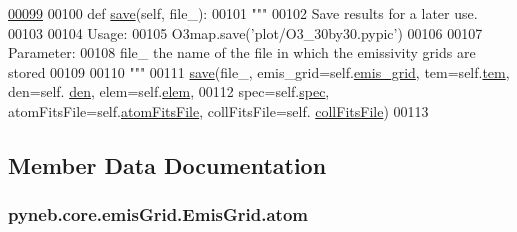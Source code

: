 \begin{DoxyCode}
\hypertarget{classpyneb_1_1core_1_1emis_grid_1_1_emis_grid_l00099}{}\hyperlink{classpyneb_1_1core_1_1emis_grid_1_1_emis_grid_a7ce505278e7503e56c2191db54e7d227}{00099} 
00100     \textcolor{keyword}{def }\hyperlink{classpyneb_1_1core_1_1emis_grid_1_1_emis_grid_a7ce505278e7503e56c2191db54e7d227}{save}(self, file\_):
00101         \textcolor{stringliteral}{"""}
00102 \textcolor{stringliteral}{        Save results for a later use.}
00103 \textcolor{stringliteral}{        }
00104 \textcolor{stringliteral}{        Usage:}
00105 \textcolor{stringliteral}{            O3map.save('plot/O3\_30by30.pypic')}
00106 \textcolor{stringliteral}{        }
00107 \textcolor{stringliteral}{        Parameter:}
00108 \textcolor{stringliteral}{            file\_  the name of the file in which the emissivity grids are stored}
00109 \textcolor{stringliteral}{}
00110 \textcolor{stringliteral}{        """}
00111         \hyperlink{classpyneb_1_1core_1_1emis_grid_1_1_emis_grid_a7ce505278e7503e56c2191db54e7d227}{save}(file\_, emis\_grid=self.\hyperlink{classpyneb_1_1core_1_1emis_grid_1_1_emis_grid_a6fd6b209384aaa2cd4ba5051477e4ecb}{emis\_grid}, tem=self.\hyperlink{classpyneb_1_1core_1_1emis_grid_1_1_emis_grid_ac6e2be63ad3ea6c0d246d1c6d1afc54b}{tem}, den=self.
      \hyperlink{classpyneb_1_1core_1_1emis_grid_1_1_emis_grid_ac393173ea0ffbfdffb4c095fa6acada1}{den}, elem=self.\hyperlink{classpyneb_1_1core_1_1emis_grid_1_1_emis_grid_a860a236b0e426b4671071e4bf492dee7}{elem},
00112              spec=self.\hyperlink{classpyneb_1_1core_1_1emis_grid_1_1_emis_grid_a78618aff86ea296ecefddcc86d98b687}{spec}, atomFitsFile=self.\hyperlink{classpyneb_1_1core_1_1emis_grid_1_1_emis_grid_a5abe442aad7ee62b912ad97ec4d71d6c}{atomFitsFile}, collFitsFile=self.
      \hyperlink{classpyneb_1_1core_1_1emis_grid_1_1_emis_grid_ad9f51a3439ea7455aaf790887fc78b3c}{collFitsFile})
00113 

\end{DoxyCode}


\subsection{Member Data Documentation}
\hypertarget{classpyneb_1_1core_1_1emis_grid_1_1_emis_grid_a2492fc08e2beca6d49dc2f1c2829b5c8}{
\subsubsection[{atom}]{\setlength{\rightskip}{0pt plus 5cm}pyneb.\-core.\-emis\-Grid.\-Emis\-Grid.\-atom}}\label{classpyneb_1_1core_1_1emis_grid_1_1_emis_grid_a2492fc08e2beca6d49dc2f1c2829b5c8}


